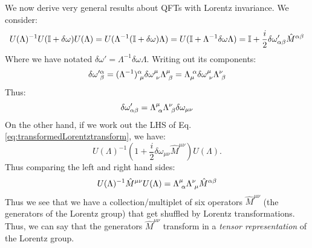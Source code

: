 We now derive very general results about QFTs with Lorentz invariance. We consider:
\begin{equation}\label{eq:transformedLorentztransform}
    U(\Lambda)^{-1}U(\mathbb{I} + \delta \omega)U(\Lambda) = U(\Lambda^{-1}(\mathbb{I} + \delta\omega)\Lambda) = U(\mathbb{I} + \Lambda^{-1}\delta\omega\Lambda) = \mathbb{I} + \frac{i}{2}\delta\omega'_{\alpha\beta}\hat{M}^{\alpha\beta}
\end{equation}
Where we have notated $\delta\omega' = \Lambda^{-1}\delta\omega\Lambda$. Writing out its components:
\begin{equation}
    \delta\omega'^{\alpha}_{\sp\beta} = (\Lambda^{-1})^\alpha_{\sp\mu} \delta\omega^\mu_{\sp\nu}\Lambda^\mu_{\sp\beta} = \Lambda^{\sp\alpha}_{\mu}\delta\omega^\mu_{\sp\nu}\Lambda^\nu_{\sp\beta}
\end{equation}
Thus:
\begin{equation}
    \delta\omega'_{\alpha\beta} = \Lambda^\mu_{\sp\alpha}\Lambda^\nu_{\sp\beta}\delta\omega_{\mu\nu}
\end{equation}
On the other hand, if we work out the LHS of Eq. \eqref{eq:transformedLorentztransform}, we have:
\begin{equation}
    U(\Lambda)^{-1}\left(1 + \frac{i}{2}\delta\omega_{\mu\nu}\hat{M}^{\mu\nu}\right)U(\Lambda).
\end{equation}
Thus comparing the left and right hand sides:
\begin{equation}\label{eq:LorentzonLorentz}
    U(\Lambda)^{-1}\hat{M}^{\mu\nu}U(\Lambda) = \Lambda^\mu_{\sp\alpha}\Lambda^\nu_{\sp\mu}\hat{M}^{\alpha\beta}
\end{equation}
Thus we see that we have a collection/multiplet of six operators $\hat{M}^{\mu\nu}$ (the generators of the Lorentz group) that get shuffled by Lorentz transformations. Thus, we can say that the generators $\hat{M}^{\mu\nu}$ transform in a \emph{tensor representation} of the Lorentz group.

